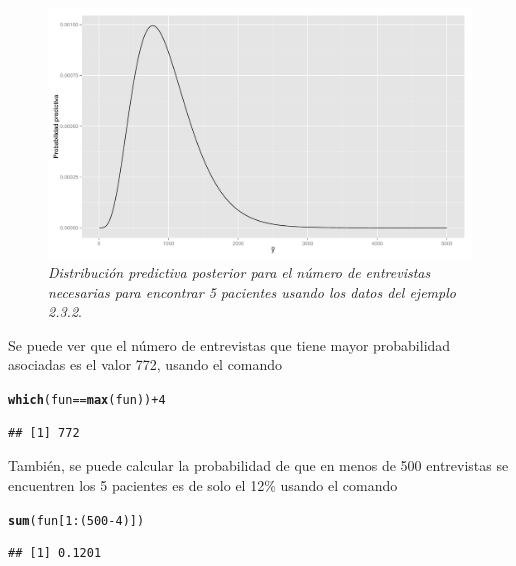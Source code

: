 \documentclass[10pt,openright]{book}\usepackage[]{graphicx}\usepackage[]{color}
\makeatletter
\newcommand{\hlnum}[1]{\textcolor[rgb]{0.686,0.059,0.569}{#1}}%
\newcommand{\hlopt}[1]{\textcolor[rgb]{0,0,0}{#1}}%
\newcommand{\hlstd}[1]{\textcolor[rgb]{0.345,0.345,0.345}{#1}}%
\newcommand{\hlkwd}[1]{\textcolor[rgb]{0.737,0.353,0.396}{\textbf{#1}}}%
\newenvironment{kframe}{%
 \def\at@end@of@kframe{}%
 \ifinner\ifhmode%
  \def\at@end@of@kframe{\end{minipage}}%
  \begin{minipage}{\columnwidth}%
 \fi\fi%
 \def\FrameCommand##1{\hskip\@totalleftmargin \hskip-\fboxsep
 \colorbox{shadecolor}{##1}\hskip-\fboxsep
     \hskip-\linewidth \hskip-\@totalleftmargin \hskip\columnwidth}%
 \MakeFramed {\advance\hsize-\width
   \@totalleftmargin\z@ \linewidth\hsize
   \@setminipage}}%
 {\par\unskip\endMakeFramed%
 \at@end@of@kframe}
\newenvironment{knitrout}{}{} %
\makeatother
\begin{document}
\begin{Eje}
    \begin{figure}[!htb]\label{jefber}
    \centering
    \includegraphics[scale=0.35]{pred_negabinom.pdf}
    \caption{\emph{Distribuci\'on predictiva posterior para el n\'umero de entrevistas necesarias para encontrar 5 pacientes usando los datos del ejemplo 2.3.2}.}
    \end{figure}
    
    Se puede ver que el n\'umero de entrevistas que tiene mayor probabilidad asociadas es el valor 772, usando el comando
\begin{knitrout}
\color{fgcolor}\begin{kframe}
\begin{alltt}
\hlkwd{which}\hlstd{(fun}\hlopt{==}\hlkwd{max}\hlstd{(fun))}\hlopt{+}\hlnum{4}
\end{alltt}
\begin{verbatim}
## [1] 772
\end{verbatim}
\end{kframe}
\end{knitrout}
    Tambi\'en, se puede calcular la probabilidad de que en menos de 500 entrevistas se encuentren los 5 pacientes es de solo el 12\% usando el comando
\begin{knitrout}
\color{fgcolor}\begin{kframe}
\begin{alltt}
\hlkwd{sum}\hlstd{(fun[}\hlnum{1}\hlopt{:}\hlstd{(}\hlnum{500}\hlopt{-}\hlnum{4}\hlstd{)])}
\end{alltt}
\begin{verbatim}
## [1] 0.1201
\end{verbatim}
\end{kframe}
\end{knitrout}
    \end{Eje}
    
\end{document}
